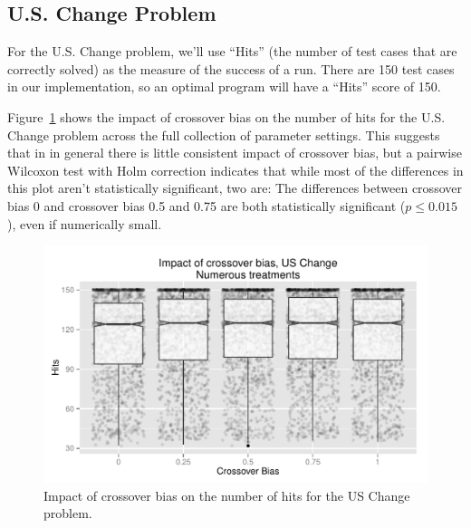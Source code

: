\documentclass{sig-alternate}
\begin{document}
%
%
%
%

\subsection{U.S. Change Problem}

For the U.S. Change problem, we'll use ``Hits'' (the number of test cases that are correctly solved) as the measure of 
the success of a run. There are 150 test cases in our implementation, so an optimal program will have a ``Hits'' score 
of 150.

Figure~\ref{fig:USChange_Hits} shows the impact of crossover bias on the number of hits for the U.S. Change 
problem across the full collection of parameter settings. This suggests that in in general there is little consistent 
impact of crossover bias, but a pairwise Wilcoxon test with Holm correction indicates that while most of the 
differences in this plot aren't statistically significant, two are: The differences between crossover bias 0 and crossover 
bias 0.5 and 0.75 are both statistically significant ($p \leq 0.015$), even if numerically small.

\begin{figure}
\centering
\includegraphics[width=0.45 \textwidth]{Plots/US_change_hits.pdf}
\caption{Impact of crossover bias on the number of hits for the US Change problem.}
\label{fig:USChange_Hits}
\end{figure}

%
%
%
%
\end{document}
